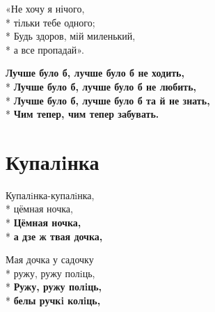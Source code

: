\medskip

\begin{minipage}{\linewidth}
«Не хочу я нічого,\\*
тільки тебе одного;\\*
Будь здоров, мій миленький,\\*
а все пропадай».\\
\end{minipage}\par\medskip\nobreak

\medskip

\begin{minipage}{\linewidth}
\hspace*{1.5em}\textbf{Лучше було б, лучше було б не ходить,}\\*
\hspace*{1.5em}\textbf{Лучше було б, лучше було б не любить,}\\*
\hspace*{1.5em}\textbf{Лучше було б, лучше було б та й не знать,}\\*
\hspace*{1.5em}\textbf{Чим тепер, чим тепер забувать.}\\
\end{minipage}

\vspace{\fill}\newpage

\section{Купалiнка}
\label{song:Купалiнка}

\medskip

\begin{minipage}{\linewidth}
Купалiнка-купалiнка,\\*
цёмная ночка,\\*
\textbf{Цёмная ночка,}\\*
\textbf{а дзе ж твая дочка,}\\
\end{minipage}\par\medskip\nobreak

\medskip

\begin{minipage}{\linewidth}
Мая дочка у садочку\\*
ружу, ружу полiць,\\*
\textbf{Ружу, ружу полiць,}\\*
\textbf{белы ручкi колiць,}\\
\end{minipage}\par\medskip\nobreak

